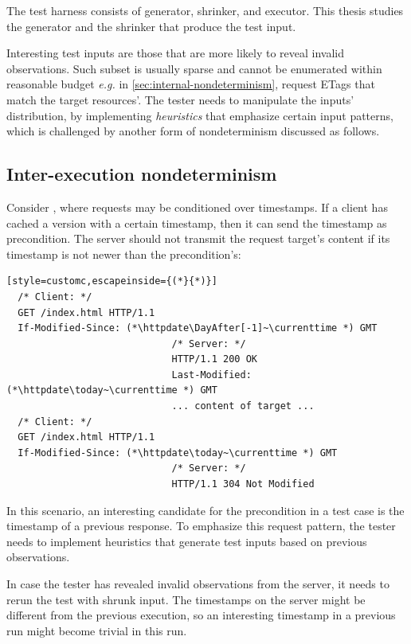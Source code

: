 The test harness consists of generator, shrinker, and executor.  This thesis
studies the generator and the shrinker that produce the test input.

Interesting test inputs are those that are more likely to reveal invalid
observations.  Such subset is usually sparse and cannot be enumerated within
reasonable budget {\it e.g.} in \autoref{sec:internal-nondeterminism}, request
ETags that match the target resources'.  The tester needs to manipulate the
inputs' distribution, by implementing {\em heuristics} that emphasize certain
input patterns, which is challenged by another form of nondeterminism discussed
as follows.

\subsection{Inter-execution nondeterminism}
\label{sec:inter-execution}
Consider \http, where requests may be conditioned over timestamps.  If a client
has cached a version with a certain timestamp, then it can send the timestamp as
 precondition.  The server should not transmit the
request target's content if its  timestamp is not newer
than the precondition's:
\begin{lstlisting}[style=customc,escapeinside={(*}{*)}]
  /* Client: */
  GET /index.html HTTP/1.1
  If-Modified-Since: (*\httpdate\DayAfter[-1]~\currenttime *) GMT
                             /* Server: */
                             HTTP/1.1 200 OK
                             Last-Modified: (*\httpdate\today~\currenttime *) GMT
                             ... content of target ...
  /* Client: */
  GET /index.html HTTP/1.1
  If-Modified-Since: (*\httpdate\today~\currenttime *) GMT
                             /* Server: */
                             HTTP/1.1 304 Not Modified
\end{lstlisting}
In this scenario, an interesting candidate for the 
precondition in a test case is the  timestamp of a
previous response.  To emphasize this request pattern, the tester needs to
implement heuristics that generate test inputs based on previous observations.

In case the tester has revealed invalid observations from the server, it needs
to rerun the test with shrunk input.  The timestamps on the server might be
different from the previous execution, so an interesting timestamp in a previous
run might become trivial in this run.

